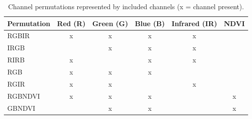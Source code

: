 \begin{table}[h!]
\centering
\begin{tabular}{l|c|c|c|c|c}
\textbf{Permutation} & \textbf{Red (R)} & \textbf{Green (G)} & \textbf{Blue (B)} & \textbf{Infrared (IR)} & \textbf{NDVI} \\
\hline
\acrshort{RGBIR}    & x & x & x & x &   \\
\acrshort{IRGB}     &   & x & x & x &   \\
\acrshort{RIRB}     & x &   & x & x &   \\
\acrshort{RGB}      & x & x & x &   &   \\
\acrshort{RGIR}     & x & x &   & x &   \\
\acrshort{RGBNDVI}  & x & x & x &   & x \\
\acrshort{GBNDVI}   &   & x & x &   & x \\
\end{tabular}
\caption{Channel permutations represented by included channels (x = channel present).}
\label{tab:perm}
\end{table}


